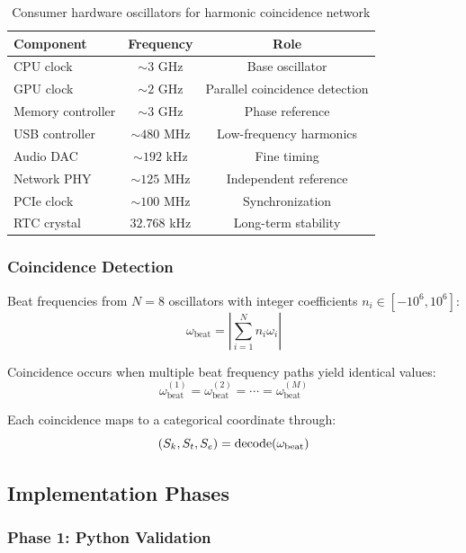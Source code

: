 \begin{table}[h]
\centering
\begin{tabular}{lcc}
\toprule
Component & Frequency & Role \\
\midrule
CPU clock & $\sim 3$ GHz & Base oscillator \\
GPU clock & $\sim 2$ GHz & Parallel coincidence detection \\
Memory controller & $\sim 3$ GHz & Phase reference \\
USB controller & $\sim 480$ MHz & Low-frequency harmonics \\
Audio DAC & $\sim 192$ kHz & Fine timing \\
Network PHY & $\sim 125$ MHz & Independent reference \\
PCIe clock & $\sim 100$ MHz & Synchronization \\
RTC crystal & $32.768$ kHz & Long-term stability \\
\bottomrule
\end{tabular}
\caption{Consumer hardware oscillators for harmonic coincidence network}
\end{table}

\subsubsection{Coincidence Detection}

Beat frequencies from $N = 8$ oscillators with integer coefficients $n_i \in [-10^6, 10^6]$:
\begin{equation}
\omega_{\text{beat}} = \left|\sum_{i=1}^N n_i \omega_i\right|
\end{equation}

Coincidence occurs when multiple beat frequency paths yield identical values:
\begin{equation}
\omega_{\text{beat}}^{(1)} = \omega_{\text{beat}}^{(2)} = \cdots = \omega_{\text{beat}}^{(M)}
\end{equation}

Each coincidence maps to a categorical coordinate through:
\begin{equation}
(S_k, S_t, S_e) = \text{decode}(\omega_{\text{beat}})
\end{equation}

\subsection{Implementation Phases}

\subsubsection{Phase 1: Python Validation}


